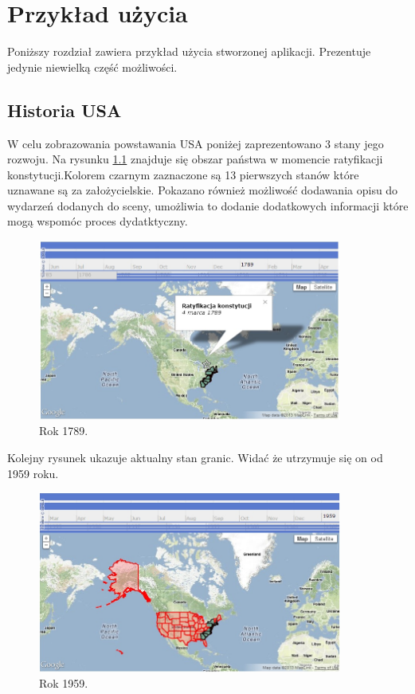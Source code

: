 \chapter{Przykład użycia}
\label{sec:useexample}
Poniższy rozdział zawiera przykład użycia stworzonej aplikacji. Prezentuje jedynie niewielką część możliwości.


\section{Historia USA}
\label{sec:usahistory}

W celu zobrazowania powstawania USA poniżej zaprezentowano 3 stany jego rozwoju. Na rysunku \ref{fig:st1} znajduje się obszar państwa w momencie ratyfikacji konstytucji.Kolorem czarnym zaznaczone są 13 pierwszych stanów które uznawane są za założycielskie. Pokazano również możliwość dodawania opisu do wydarzeń dodanych do sceny, umożliwia to dodanie dodatkowych informacji które mogą wspomóc proces dydatktyczny.

\begin{figure}[H]
  \centering
    \includegraphics[width=100mm]{ge/st1.jpg}
  \caption{Rok 1789.}
  \label{fig:st1}
\end{figure}

Kolejny rysunek ukazuje aktualny stan granic. Widać że utrzymuje się on od 1959 roku.

\begin{figure}[H]
  \centering
    \includegraphics[width=100mm]{ge/st3.jpg}
  \caption{Rok 1959.}
  \label{fig:st3}
\end{figure}

